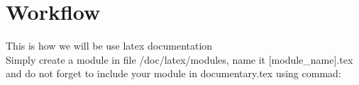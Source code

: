 \section{Workflow}

\large{This is how we will be use latex documentation}\\
Simply create a module in file /doc/latex/modules, name it [module\_name].tex and do not forget to
include your module in documentary.tex using commad:
\\\\\\

\begin{lstlisting}
    
\end{lstlisting}